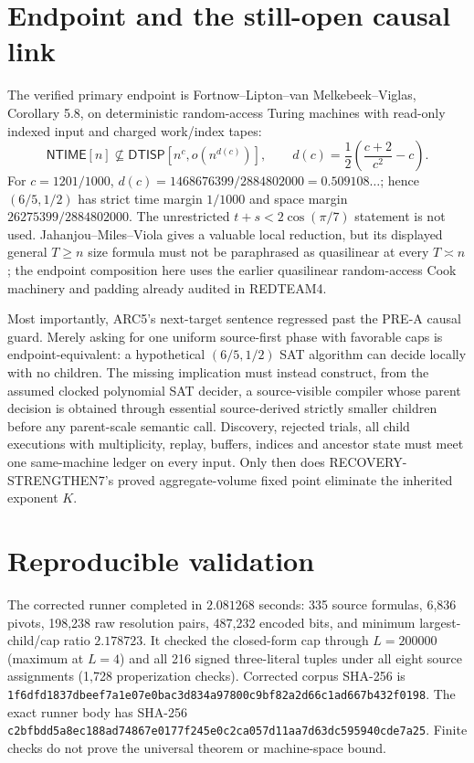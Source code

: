 \documentclass[11pt]{article}
\newcommand{\DTISP}{\mathsf{DTISP}}
\newcommand{\NTIME}{\mathsf{NTIME}}
\begin{document}
\section{Endpoint and the still-open causal link}
The verified primary endpoint is Fortnow--Lipton--van Melkebeek--Viglas,
Corollary 5.8, on deterministic random-access Turing machines with read-only
indexed input and charged work/index tapes:
\[
 \NTIME[n]\not\subseteq
 \DTISP[n^c,o(n^{d(c)})],\qquad
 d(c)=\frac12\left(\frac{c+2}{c^2}-c\right).
\]
For $c=1201/1000$,
$d(c)=1468676399/2884802000=0.509108\ldots$; hence $(6/5,1/2)$ has strict
time margin $1/1000$ and space margin
$26275399/2884802000$.  The unrestricted
$t+s<2\cos(\pi/7)$ statement is not used.  Jahanjou--Miles--Viola gives a
valuable local reduction, but its displayed general $T\ge n$ size formula
must not be paraphrased as quasilinear at every $T\asymp n$; the endpoint
composition here uses the earlier quasilinear random-access Cook machinery
and padding already audited in REDTEAM4.

Most importantly, ARC5's next-target sentence regressed past the PRE-A causal
guard.  Merely asking for one uniform source-first phase with favorable caps
is endpoint-equivalent: a hypothetical $(6/5,1/2)$ SAT algorithm can decide
locally with no children.  The missing implication must instead construct,
from the assumed clocked polynomial SAT decider, a source-visible compiler
whose parent decision is obtained through essential source-derived strictly
smaller children before any parent-scale semantic call.  Discovery, rejected
trials, all child executions with multiplicity, replay, buffers, indices and
ancestor state must meet one same-machine ledger on every input.  Only then
does RECOVERY-STRENGTHEN7's proved aggregate-volume fixed point eliminate
the inherited exponent $K$.

\section{Reproducible validation}
The corrected runner completed in $2.081268$ seconds: 335 source formulas,
6,836 pivots, 198,238 raw resolution pairs, 487,232 encoded bits, and minimum
largest-child/cap ratio $2.178723$.  It checked the closed-form cap through
$L=200000$ (maximum at $L=4$) and all 216 signed three-literal tuples under
all eight source assignments (1,728 properization checks).  Corrected corpus
SHA-256 is
\texttt{1f6dfd1837dbeef7a1e07e0bac3d834a97800c9bf82a2d66c1ad667b432f0198}.
The exact runner body has SHA-256
\texttt{c2bfbdd5a8ec188ad74867e0177f245e0c2ca057d11aa7d63dc595940cde7a25}.
Finite checks do not prove the universal theorem or machine-space bound.
\end{document}
